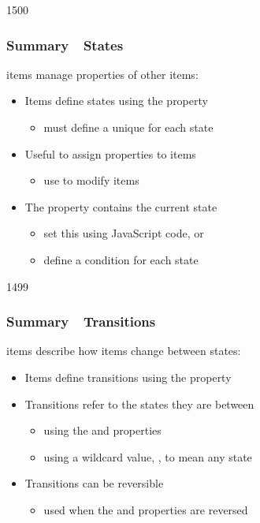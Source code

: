 \begin{slide}{1500}\frametitle{Summary~\textendash~States}

 items manage properties of other items:

\begin{itemize}
\item Items define states using the  property
  \begin{itemize}
  \item must define a unique  for each state
  \end{itemize}
\item Useful to assign  properties to items
  \begin{itemize}
  \item use  to modify items
  \end{itemize}
\item The  property contains the current state
  \begin{itemize}
  \item set this using JavaScript code, or
  \item define a  condition for each state
  \end{itemize}
\end{itemize}

\end{slide}


\begin{slide}{1499}\frametitle{Summary~\textendash~Transitions}

 items describe how items change between states:

\begin{itemize}
\item Items define transitions using the  property
\item Transitions refer to the states they are between
  \begin{itemize}
  \item using the  and  properties
  \item using a wildcard value, , to mean any state
  \end{itemize}
\item Transitions can be reversible
  \begin{itemize}
  \item used when the  and  properties are reversed
  \end{itemize}
\end{itemize}

\end{slide}             



